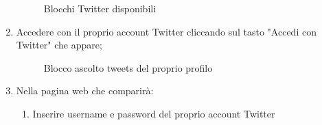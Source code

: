 \begin{enumerate}
\begin{figure}[!ht]
		\caption{Blocchi Twitter disponibili}
	\end{figure}
	\newpage
	\item Accedere con il proprio account Twitter cliccando sul tasto
		"Accedi con Twitter" che appare;
		\begin{figure}[!ht]
			\centering
			\caption{Blocco ascolto tweets del proprio profilo}
		\end{figure}
	\newpage
	\item Nella pagina web che comparirà:
		\begin{enumerate}
			\item Inserire username e password del proprio account Twitter

\end{enumerate}
\end{enumerate}
